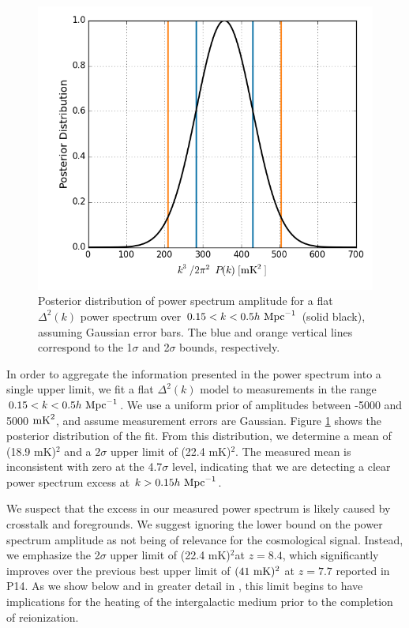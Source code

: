 \documentclass[twocolumn,numberedappendix]{emulateapj} \shorttitle{New Limits on the 21 cm Power Spectrum at $z=8.4$}
\newcommand{\hMpci}{h\ {\rm Mpc}^{-1}}
\newcommand{\mKlimit}{(22.4 mK)$^2$}
\begin{document}
\begin{figure}\centering
\includegraphics[width=\columnwidth]{plots/flat_k3pk_posterior.png}
\caption{
Posterior distribution of power spectrum amplitude for a flat $\Delta^{2}(k)$
power spectrum over $0.15<k<0.5\hMpci$ (solid black),
assuming Gaussian error bars. The blue and orange
vertical lines correspond to the 1$\sigma$ and 2$\sigma$ bounds, respectively.
}
\label{fig:final_posterior}
\end{figure}

In order to aggregate the information presented in the power spectrum into
a single upper limit, we fit a flat $\Delta^2(k)$ model to measurements
in the range $0.15<k<0.5\hMpci$.  We use a uniform prior of amplitudes between
-5000 and 5000 ${\rm mK}^2$, and assume measurement errors are Gaussian.
Figure \ref{fig:final_posterior} shows the posterior distribution of the fit.
From this distribution, we determine a mean of
(18.9 mK)$^2$ and a $2\sigma$ upper limit of \mKlimit.
The measured mean is inconsistent with zero at the 4.7$\sigma$ level, indicating that
we are detecting a clear power spectrum excess at $k>0.15\hMpci$.

We suspect that the excess in our measured power spectrum is likely caused
by crosstalk and foregrounds.  We suggest ignoring the lower bound on the power spectrum amplitude
as not being of relevance for the cosmological signal.  Instead, we emphasize the 
2$\sigma$ upper limit of \mKlimit at $z=8.4$, which significantly improves over the previous
best upper limit of $(41~{\rm mK})^2$ at $z=7.7$ reported in P14.  As we show below and in
greater detail in \citet{pober_et_al2015}, this limit begins to have implications
for the heating of the intergalactic medium prior to the completion of reionization.
\end{document}
